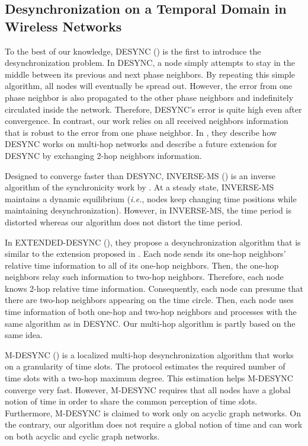 \subsection{Desynchronization on a Temporal Domain in Wireless Networks}
\label{sec:timedesync}
To the best of our knowledge, DESYNC (\cite{4379660})  is the first to introduce the desynchronization problem. In DESYNC, a node simply attempts to stay in the middle between its previous and next phase neighbors. By repeating this simple algorithm, all nodes will eventually be spread out. However, the error from one phase neighbor is also propagated to the other phase neighbors and indefinitely circulated inside the network. Therefore, DESYNC's error is quite high even after convergence. In contrast, our work relies on all received neighbors information that is robust to the error from one phase neighbor. 
 In  \cite{4663417}, they describe how DESYNC works on multi-hop networks and describe a future extension for DESYNC by exchanging 2-hop neighbors information. 

Designed to converge faster than DESYNC, INVERSE-MS (\cite{4274893}) is an inverse algorithm of the synchronicity work by \cite{MS1990}. 
At a steady state, INVERSE-MS maintains a dynamic equilibrium (\textit{i.e.}, nodes keep changing time positions while maintaining desynchronization). 
However, in INVERSE-MS, the time period is distorted whereas our algorithm does not distort the time period.

In EXTENDED-DESYNC (\cite{MK09DESYNC}), they propose a desynchronization algorithm that is similar to the extension proposed in \cite{4663417}.
Each node sends its one-hop neighbors' relative time information to all of its one-hop neighbors.
Then, the one-hop neighbors relay such information to two-hop neighbors.
Therefore, each node knows 2-hop relative time information.
Consequently, each node can presume that there are two-hop neighbors appearing on the time circle.
Then, each node uses time information of both one-hop and two-hop neighbors and processes with the same algorithm as in DESYNC. Our multi-hop algorithm is partly based on the same idea.

M-DESYNC (\cite{5062256}) is a localized multi-hop desynchronization algorithm that works on a granularity of time slots. The protocol estimates the required number of time slots with a two-hop maximum degree. This estimation helps M-DESYNC converge very fast. However, M-DESYNC requires that all nodes have a global notion of time in order to share the common perception of time slots. Furthermore, M-DESYNC is claimed to work only on acyclic graph networks. On the contrary, our algorithm does not require a global notion of time and can work on both acyclic and cyclic graph networks.

